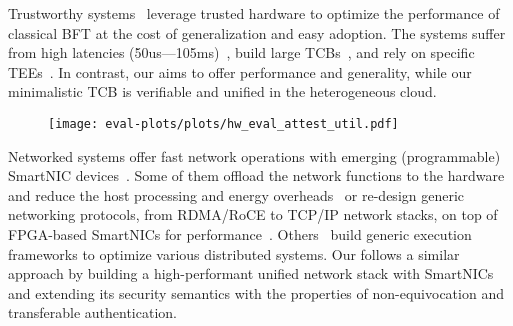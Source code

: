  Trustworthy systems~\cite{10.1145/3492321.3519568, minBFT, 10.1145/3552326.3587455, 10.1145/3492321.3519568, treaty, avocado, ccf} leverage trusted hardware to optimize the performance of classical BFT at the cost of generalization and easy adoption. The systems suffer from high latencies (50us---105ms)~\cite{levin2009trinc, 10.1145/2168836.2168866}, build large TCBs~\cite{treaty, avocado}, and rely on specific TEEs~\cite{minBFT, hybster}. In contrast, our \projecttitle{} aims to offer performance and generality, while our minimalistic TCB is verifiable and unified in the heterogeneous cloud. 

\begin{figure}
    \centering
    \texttt{[image: eval-plots/plots/hw\_eval\_attest\_util.pdf]}
    \vspace{-10pt}
  \caption{ }
    \label{fig:scalability}
\end{figure}

 Networked systems offer fast network operations with emerging (programmable) SmartNIC devices~\cite{liquidIO_smartnics,u280_smartnics,bluefield_smartnics,broadcom_smartnics,netronome_smartnics,alibaba_smartnics,nitro_smartnics,msr_smartnics}. Some of them offload the network functions to the hardware and reduce the host processing and energy overheads~\cite{246498,211249,10.1145/3387514.3405895,10.1145/3365609.3365851,10.1145/3127479.3132252,258971,246486,179716,227655,10.1145/3286062.3286068,shan2022supernic,10.1145/3390251.3390257} or re-design generic networking protocols, from RDMA/RoCE to TCP/IP network stacks, on top of FPGA-based SmartNICs for performance~\cite{coyote,corundum,storm,8891991,280712,9114811,opennic_project}. Others~\cite{10.1145/3341302.3342079,10.1145/2872362.2872367,234944,9220629,6853195,10292786,10.1145/3477132.3483555,280678,10.1145/3132747.3132756,honeycomb,288659,10329593} build generic execution frameworks to optimize various distributed systems. Our \projecttitle{} follows a similar approach by building a high-performant unified network stack with SmartNICs and extending its security semantics with the properties of non-equivocation and transferable authentication.%


